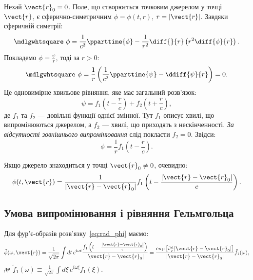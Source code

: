 Нехай $\vect{r}_0 = 0$. Поле, що створюється точковим джерелом у точці $\vect{r}$, є сферично-симетричним $\phi = \phi(t, r)$, $r = |\vect{r}|$. Завдяки
сферичній симетрії:
\begin{equation*}
	\mdlgwhtsquare\ \phi = \frac1{c^2}\pparttime{\phi} - \frac1{r^2} \diff{}{r}\left(r^2 \diff{\phi}{r} \right) .
\end{equation*}
Покладемо $\phi = \frac{\psi}{r}$, тоді за $r>0$:
\begin{equation*}
	\mdlgwhtsquare\ \phi = \frac1r \left( \frac1{c^2}\pparttime{\psi} - \ddiff{\psi}{r}\right) =0 .
\end{equation*}
Це одновимірне хвильове рівняння, яке має загальний розв’язок:
\begin{equation*}
	\psi = f_1\left( t - \frac{r}c \right) + f_2\left( t + \frac{r}c \right),
\end{equation*}
де $f_1$ та $f_2$ --- довільні функції однієї змінної. Тут $f_1$ описує хвилі, що
випромінюються джерелом, а $f_2$ --- хвилі, що приходять з нескінченності. \emph{За
	відсутності зовнішнього випромінювання} слід покласти $f_2=0$. Звідси:
\begin{equation*}
	\phi = \frac1r f_1\left( t - \frac{r}c \right).
\end{equation*}

Якщо джерело знаходиться у точці $\vect{r}_0 \neq 0$, очевидно:
\begin{equation}\label{eq:rad_phi}
	\phi(t, \vect{r}) = \frac1{|\vect{r} - \vect{r}_0|} f_1\left( t - \frac{|\vect{r} - \vect{r}_0|}c \right).
\end{equation}

\subsection*{Умова випромінювання і рівняння Гельмгольца}


Для фур'є-образів розв’язку~\eqref{eq:rad_phi} маємо:
\begin{equation}
	\tilde{\phi} (\omega, \vect{r}) = \frac{1}{\sqrt{2\pi}} \int dt \, e^{i\omega t} \frac{f_1\left(t - \frac{|\vect{r} - \vect{r}_0|}{c}\right)}{|\vect{r} - \vect{r}_0|}  =
	\frac{\exp \left[ i \frac{\omega}{c} |\vect{r} - \vect{r}_0| \right] }{|\vect{r} - \vect{r}_0|}\tilde{f}_1(\omega),
\end{equation}
де
\(
	\tilde{f}_1 (\omega) \equiv \frac{1}{\sqrt{2\pi}} \int d\xi \, e^{i\omega \xi} f_1(\xi).
\)


